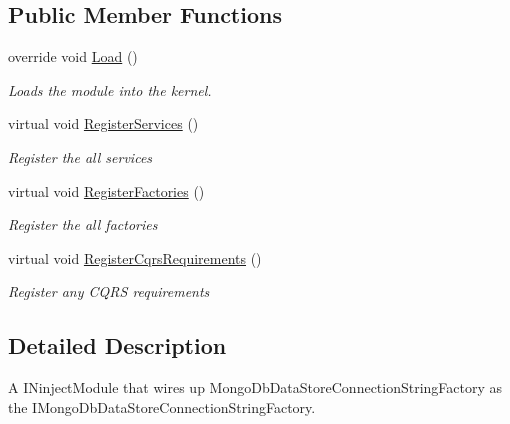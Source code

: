 \subsection*{Public Member Functions}
\begin{DoxyCompactItemize}
\item 
override void \hyperlink{classCqrs_1_1Ninject_1_1MongoDB_1_1Configuration_1_1MongoDbDataStoreModule_a29425d24f414443a98a59dad09dcadfc_a29425d24f414443a98a59dad09dcadfc}{Load} ()
\begin{DoxyCompactList}\small\item\em Loads the module into the kernel. \end{DoxyCompactList}\item 
virtual void \hyperlink{classCqrs_1_1Ninject_1_1MongoDB_1_1Configuration_1_1MongoDbDataStoreModule_a4500dc7d8760b2cb9ac70fa90acc7ac9_a4500dc7d8760b2cb9ac70fa90acc7ac9}{Register\+Services} ()
\begin{DoxyCompactList}\small\item\em Register the all services \end{DoxyCompactList}\item 
virtual void \hyperlink{classCqrs_1_1Ninject_1_1MongoDB_1_1Configuration_1_1MongoDbDataStoreModule_a8b2ad4e3919423212f0e23614fda4473_a8b2ad4e3919423212f0e23614fda4473}{Register\+Factories} ()
\begin{DoxyCompactList}\small\item\em Register the all factories \end{DoxyCompactList}\item 
virtual void \hyperlink{classCqrs_1_1Ninject_1_1MongoDB_1_1Configuration_1_1MongoDbDataStoreModule_ad1630c7f82d9a0a452682e855277280d_ad1630c7f82d9a0a452682e855277280d}{Register\+Cqrs\+Requirements} ()
\begin{DoxyCompactList}\small\item\em Register any C\+Q\+RS requirements \end{DoxyCompactList}\end{DoxyCompactItemize}


\subsection{Detailed Description}
A I\+Ninject\+Module that wires up Mongo\+Db\+Data\+Store\+Connection\+String\+Factory as the I\+Mongo\+Db\+Data\+Store\+Connection\+String\+Factory. 



